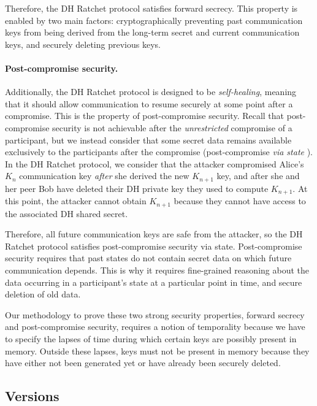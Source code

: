 Therefore, the DH Ratchet protocol satisfies forward secrecy. This property is enabled by two main factors: cryptographically preventing past communication keys from being derived from the long-term secret and current communication keys, and securely deleting previous keys.

\paragraph{Post-compromise security.}
\label{sec:post-compromise-security}

Additionally, the DH Ratchet protocol is designed to be \emph{self-healing}, meaning that it should allow communication to resume securely at some point after a compromise. This is the property of post-compromise security.
Recall that post-compromise security is not achievable after the \emph{unrestricted} compromise of a participant, but we instead consider that some secret data remains available exclusively to the participants after the compromise (post-compromise \emph{via state} \cite{}).
In the DH Ratchet protocol, we consider that the attacker compromised Alice's $K_n$ communication key \emph{after} she derived the new $K_{n+1}$ key, and after she and her peer Bob have deleted their DH private key they used to compute $K_{n+1}$.
At this point, the attacker cannot obtain $K_{n+1}$ because they cannot have access to the associated DH shared secret.

Therefore, all future communication keys are safe from the attacker, so the DH Ratchet protocol satisfies post-compromise security via state.
Post-compromise security requires that past states do not contain secret data on which future communication depends. This is why it requires fine-grained reasoning about the data occurring in a participant's state at a particular point in time, and secure deletion of old data.

Our methodology to prove these two strong security properties, forward secrecy and post-compromise security, requires a notion of temporality because we have to specify the lapses of time during which certain keys are possibly present in memory. Outside these lapses, keys must not be present in memory because they have either not been generated yet or have already been securely deleted.

\subsection{Versions}
\label{sec:versions}

